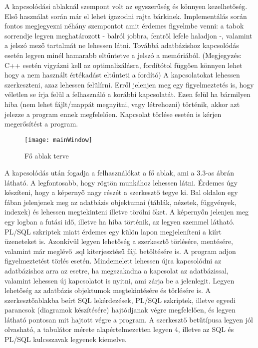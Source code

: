 A kapcsolódási ablaknál szempont volt az egyszerűség és könnyen kezelhetőség. Első használat
során már el lehet igazodni rajta bárkinek. Implementálás során fontos megjegyezni néhány szempontot
amit érdemes figyelmbe venni: a tabok sorrendje legyen meghatározott - balról jobbra, fentről lefele haladjon -, valamint
a jelszó mező tartalmát ne lehessen látni. Továbbá adatbázishoz kapcsolódás esetén legyen minél hamarabb eltűntetve a
jelszó a memóriából. (Megjegyzés: C++ esetén vigyázni kell az optimalizálásra, fordítótol függően könnyen lehet hogy a nem használt értékadást
eltűnteti a fordító) A kapcsolatokat lehessen szerkeszteni, azaz lehessen felülírni. Erről jelenjen meg egy figyelmeztetés is,
hogy véletlen se írja felül a felhasználó a korábbi kapcsolatát. Ezen felül ha bármilyen hiba (nem lehet fájlt/mappát megnyitni, vagy létrehozni)
történik, akkor azt jelezze a program ennek megfelelően. Kapcsolat törlése esetén is kérjen megerősítést a program.

\begin{figure}[ht]
  \begin{center}
  \texttt{[image: mainWindow]}
  \end{center}
 \caption{Fő ablak terve}
\end{figure}

A kapcsolódás után fogadja a felhasználókat a fő ablak, ami a 3.3-as ábrán látható. A legfontosabb, hogy rögtön munkához lehessen látni.
Érdemes úgy készíteni, hogy a képernyő nagy részét a szerkesztő tegye ki. Bal oldalon egy fában jelenjenek meg az adatbázis objektumai
(táblák, nézetek, függvények, indexek) és lehessen megtekinteni illetve törölni őket. A képernyőn jelenjen meg egy logban a futási idő,
illetve ha hiba történik, az legyen szemmel látható. PL/SQL szkriptek miatt érdemes egy külön lapon megjeleníteni a kiírt üzeneteket is.
Azonkívül legyen lehetőség a szerkesztő törlésére, mentésére, valamint már meglévő .sql kiterjesztésű fájl betöltésére is. A program adjon figyelmeztetést
törlés esetén. Mindemelett lehessen újra kapcsolódni az adatbázishoz arra az esetre, ha megszakadna a kapcsolat az adatbázissal, valamint
lehessen új kapcsolatot is nyitni, ami zárja be a jelenlegit. Legyen lehetőség az adatbázis objektumok megtekintésére és törlésére is.
A szerkesztőablakba beírt SQL lekérdezések, PL/SQL szkriptek, illetve egyedi parancsok (diagramok készítésére) hajtódjanak végre megfelelően,
és legyen látható pontosan mit hajtott végre a program. A szerkesztő betűtípusa legyen jól olvasható, a tabulátor mérete alapértelmezetten legyen
4, illetve az SQL és PL/SQL kulcsszavak legyenek kiemelve.
\newpage
